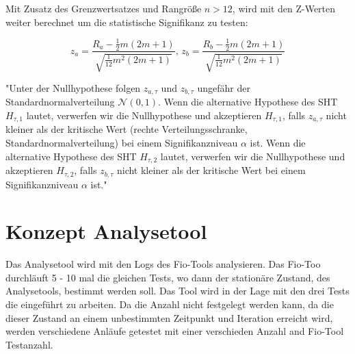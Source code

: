 Mit Zusatz des Grenzwertsatzes und Rangröße $n > 12$, wird mit den Z-Werten weiter berechnet um die statistische Signifikanz zu testen:

\begin{center}
  \[
    z_{a} = \frac{R_{a} - \frac{1}{2}m(2m+1)}{\sqrt{\frac{1}{12}m^2(2m+1)}} \text{, }
    z_{b} = \frac{R_{b} - \frac{1}{2}m(2m+1)}{\sqrt{\frac{1}{12}m^2(2m+1)}}
  \]
\end{center}

"Unter der Nullhypothese folgen \( z_{a,\tau} \) und \( z_{b,\tau} \) ungefähr der Standardnormalverteilung \(\mathcal{N}(0, 1)\). 
Wenn die alternative Hypothese des SHT \( H_{\tau,1} \) lautet, verwerfen wir die Nullhypothese und akzeptieren \( H_{\tau,1} \), 
falls \( z_{a,\tau} \) nicht kleiner als der kritische Wert (rechte Verteilungsschranke, Standardnormalverteilung) bei einem Signifikanzniveau \(\alpha\) ist.
Wenn die alternative Hypothese des SHT \( H_{\tau,2} \) lautet, verwerfen wir die Nullhypothese und akzeptieren \( H_{\tau,2} \), 
falls \( z_{b,\tau} \) nicht kleiner als der kritische Wert bei einem Signifikanzniveau \(\alpha\) ist."


\section{Konzept Analysetool}
Das Analysetool wird mit den Logs des Fio-Tools analysieren.
Das Fio-Too durchläuft 5 - 10 mal die gleichen Tests, wo dann der stationäre Zustand, des Analysetools,
bestimmt werden soll. Das Tool wird in der Lage mit den drei Tests die eingeführt zu arbeiten.
Da die Anzahl nicht festgelegt werden kann, da die dieser Zustand an einem unbestimmten Zeitpunkt und Iteration erreicht wird,
werden verschiedene Anläufe getestet mit einer verschieden Anzahl and Fio-Tool Testanzahl.

